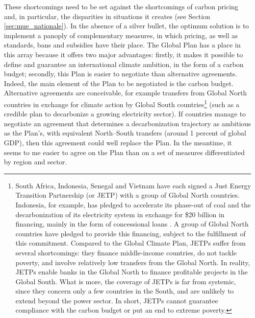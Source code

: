 \documentclass[a5paper,english,openany]{memoir}
\begin{document}
These shortcomings need to be set against the shortcomings of carbon pricing and, in particular, %
the disparities in situations it creates (see Section \ref{sec:mue_nationale}). %
In the absence of a silver bullet, the optimum solution is to implement a panoply of complementary measures, in which pricing, %
as well as standards, bans and subsidies have their place. The Global Plan has a place in this array %
because it offers two major advantages: firstly, it makes it possible to define and guarantee an international climate ambition, in the form of a carbon budget; secondly, this Plan is easier to negotiate than alternative agreements. Indeed, the main element of the Plan to be negotiated is the carbon budget. Alternative agreements are conceivable, for example transfers from Global North countries in exchange for climate action by Global South countries\footnote{South Africa, Indonesia, Senegal and Vietnam have each signed a Just Energy Transition Partnership (or JETP) with a group of Global North countries. Indonesia, for example, has pledged to accelerate its phase-out of coal and the decarbonization %
of its electricity system in exchange for \$20 billion in financing, mainly in the form of concessional loans \citep{ha-duong_just_2023}. A group of Global North countries have pledged to provide this financing, subject to the fulfillment %
of this commitment. Compared to the Global Climate Plan, JETPs suffer from several shortcomings: they finance middle-income %
countries, do not tackle poverty, and involve relatively low transfers from the Global North. In reality, JETPs enable banks in the Global North to finance profitable projects in the Global South. What is %
more, the coverage of JETPs is far from systemic, since they concern only a few countries in the South, and are unlikely to extend beyond the power sector. In short, JETPs cannot guarantee compliance with the carbon budget or put an end to extreme poverty.} 
(such as a credible plan to decarbonize %
a growing electricity sector). If countries manage to negotiate an agreement that determines a decarbonization %
trajectory as ambitious as the Plan's, with equivalent North--South transfers (around 1 percent of global GDP), then this agreement could well replace the Plan. In the meantime, it seems to me easier to agree on the Plan than on a set of measures differentiated by region and sector.
\end{document}
